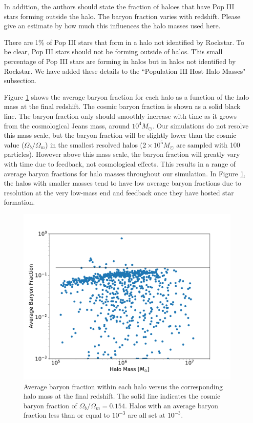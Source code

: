 \documentclass[11pt]{article}
\newenvironment{referee}[1][]{%
    \ignorespaces%
    \begin{mdframed}[style=myquotestyle,#1]%
}{%
    \end{mdframed}%
    \ignorespacesafterend%
}%
\begin{document}
\begin{referee}
In addition, the authors should state the fraction of haloes that have Pop III stars forming outside the halo. The baryon fraction varies with redshift. Please give an estimate by how much this influences the halo masses used here.
\end{referee}
There are 1\% of Pop III stars that form in a halo not identified by Rockstar.  To be clear, Pop III stars should not be forming outside of halos. This small percentage of Pop III stars are forming in halos but in halos not identified by Rockstar.  We have added these details to the ``Population III Host Halo Masses" subsection.

Figure \ref{fig:avg_baryon_fraction} shows the average baryon fraction for each halo as a function of the halo mass at the final redshift. The cosmic baryon fraction is shown as a solid black line. The baryon fraction only should smoothly increase with time as it grows from the cosmological Jeans mass, around $10^{4} M_{\odot}$.  Our simulations do not resolve this mass scale, but the baryon fraction will be slightly lower than the cosmic value ($\Omega_b/\Omega_m$) in the smallest resolved halos ($2 \times 10^5 M_\odot$ are sampled with 100 particles).  However above this mass scale, the baryon fraction will greatly vary with time due to feedback, not cosmological effects. This results in a range of average baryon fractions for halo masses throughout our simulation. In Figure \ref{fig:avg_baryon_fraction}, the halos with smaller masses tend to have low average baryon fractions due to resolution at the very low-mass end and feedback once they have hosted star formation.

\begin{figure}[ht!]
  \centering
  \includegraphics[keepaspectratio=true, scale=0.4]{images/avg_baryon_fraction.pdf}
  \caption{\label{fig:avg_baryon_fraction} Average baryon fraction within each halo versus the corresponding halo mass at the final redshift. The solid line indicates the cosmic baryon fraction of $\Omega_b / \Omega_m = 0.154$. Halos with an average baryon fraction less than or equal to $10^{-3}$ are all set at $10^{-3}$.}
\end{figure}
\end{document}
